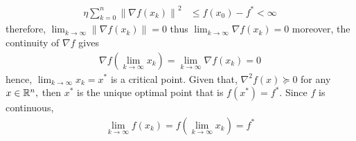 \documentclass{ExerciseSheet}
\begin{document}
\begin{solution}
  \begin{align*}
      \eta\sum_{k=0}^{n}\left\|\nabla f(x_k)\right\|^2&\leq f(x_0) - f^*< \infty     
  \end{align*}
therefore,  $\displaystyle \lim_{k\to\infty}\left\|\nabla f(x_k)\right\|=0$ thus
 $\displaystyle \lim_{k\to\infty}\nabla f(x_k)=0$ moreover, the continuity of $\nabla f$ gives
 \begin{align*}
     \nabla f (\lim_{k\to\infty}x_k)= \lim_{k\to\infty}\nabla f(x_k)=0
 \end{align*}
hence, $\displaystyle\lim_{k\to\infty}x_k=x^*$ is a critical point. Given that,  $\nabla^2 f(x) \succcurlyeq 0$ for any $x \in \mathbb{R}^n,$ then $x^*$ is the unique optimal point that is $f(x^*)=f^*.$ Since $f$ is continuous, 
\begin{align*}
    \lim_{k\to\infty}f(x_k)= f(\lim_{k\to\infty}x_k)=f^*
\end{align*}
\end{solution}

\fi
\end{document}
